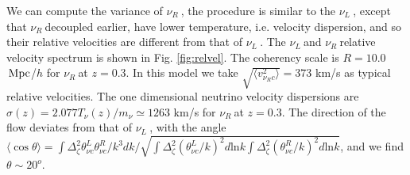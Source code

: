 \documentclass[aps,prl,twocolumn,showpacs,superscriptaddress,groupedaddress,nofootinbib]{revtex4}  %
\newcommand{\mr}{\mathrm}
\newcommand{\Mpc}{\ensuremath{\,{\rm Mpc}}}
\newcommand{\nur}{\ensuremath{{\nu_R~}}}
\newcommand{\nul}{\ensuremath{{\nu_L~}}}
\begin{document}



We can compute the variance of \nur, the procedure is similar to the \nul,
except that \nur decoupled earlier, have
lower temperature, i.e. velocity dispersion, and so their relative 
velocities are different from that of \nul.
The \nul and \nur relative velocity spectrum is shown in
Fig. \ref{fig:relvel}. The coherency scale 
is $R = 10.0$ \Mpc/$h$ for \nur at $z=0.3$. In this model we take
$\sqrt{\langle v^2_{\nu_R c}\rangle} = 373$ km/s as typical relative
velocities.  The one dimensional neutrino velocity dispersions are 
$\sigma(z)=2.077T_\nu(z)/m_\nu \simeq 1263$ km/s for \nur at $z=0.3$.   The
direction of the flow deviates from that of \nul, with the angle
$\langle\cos\theta\rangle=
\int\Delta_\zeta^2\theta^L_{\nu c}\theta^R_{\nu c}/k^3dk/ 
\sqrt{\int\Delta_\zeta^2(\theta^{L}_{\nu c}/k)^2d\mr{ln}k
\int\Delta_\zeta^2(\theta^{R}_{\nu c}/k)^2d\mr{ln}k}$, 
and we find $\theta \sim 20^o$.
\end{document}
